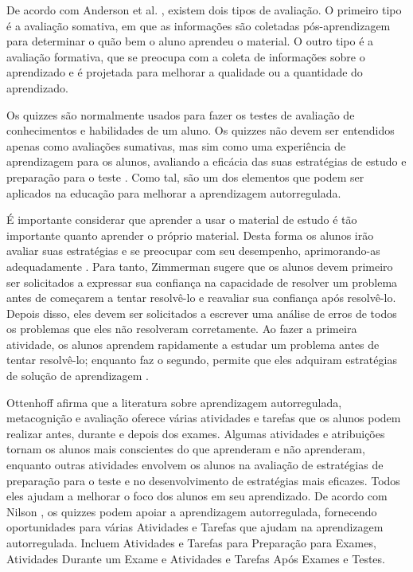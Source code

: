 De acordo com Anderson et al. \cite{anderson_taxonomy_2000}, existem dois tipos de avaliação. O primeiro tipo é a avaliação somativa, em que as informações são coletadas pós-aprendizagem para determinar o quão bem o aluno aprendeu o material. O outro tipo é a avaliação formativa, que se preocupa com a coleta de informações sobre o aprendizado e é projetada para melhorar a qualidade ou a quantidade do aprendizado.

Os quizzes são normalmente usados para fazer os testes de avaliação de conhecimentos e habilidades de um aluno. Os quizzes não devem ser entendidos apenas como avaliações sumativas, mas sim como uma experiência de aprendizagem para os alunos, avaliando a eficácia das suas estratégias de estudo e preparação para o teste \cite{nilson_creating_2013}. Como tal, são um dos elementos que podem ser aplicados na educação para melhorar a aprendizagem autorregulada.

É importante considerar que aprender a usar o material de estudo é tão importante quanto aprender o próprio material. Desta forma os alunos irão avaliar suas estratégias e se preocupar com seu desempenho, aprimorando-as adequadamente \cite{fink_creating_2013}. Para tanto, Zimmerman sugere que os alunos devem primeiro ser solicitados a expressar sua confiança na capacidade de resolver um problema antes de começarem a tentar resolvê-lo e reavaliar sua confiança após resolvê-lo. Depois disso, eles devem ser solicitados a escrever uma análise de erros de todos os problemas que eles não resolveram corretamente. Ao fazer a primeira atividade, os alunos aprendem rapidamente a estudar um problema antes de tentar resolvê-lo; enquanto faz o segundo, permite que eles adquiram estratégias de solução de aprendizagem \cite{zimmerman_enhancing_2011}.

Ottenhoff \cite{ottenhoff_learning_2011} afirma que a literatura sobre aprendizagem autorregulada, metacognição e avaliação oferece várias atividades e tarefas que os alunos podem realizar antes, durante e depois dos exames. Algumas atividades e atribuições tornam os alunos mais conscientes do que aprenderam e não aprenderam, enquanto outras atividades envolvem os alunos na avaliação de estratégias de preparação para o teste e no desenvolvimento de estratégias mais eficazes. Todos eles ajudam a melhorar o foco dos alunos em seu aprendizado. De acordo com Nilson \cite{nilson_creating_2013}, os quizzes podem apoiar a aprendizagem autorregulada, fornecendo oportunidades para várias Atividades e Tarefas que ajudam na aprendizagem autorregulada. Incluem Atividades e Tarefas para Preparação para Exames, Atividades Durante um Exame e Atividades e Tarefas Após Exames e Testes.

